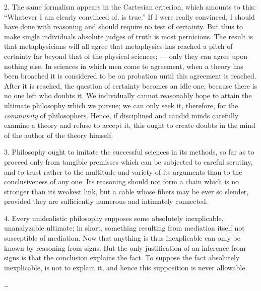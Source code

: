 2. The same formalism appears in the Cartesian criterion, which amounts to this: ``Whatever I am clearly convinced of, is true.'' If I were really convinced, I should have done with reasoning and should require no test of certainty. But thus to make single individuals absolute judges of truth is most pernicious. The result is that metaphysicians will all agree that metaphysics has reached a pitch of certainty far beyond that of the physical sciences; --- only they can agree upon nothing else. In sciences in which men come to agreement, when a theory has been broached it is considered to be on probation until this agreement is reached. After it is reached, the question of certainty becomes an idle one, because there is no one left who doubts it. We individually cannot reasonably hope to attain the ultimate philosophy which we pursue; we can only seek it, therefore, for the \emph{community} of philosophers. Hence, if disciplined and candid minds carefully examine a theory and refuse to accept it, this ought to create doubts in the mind of the author of the theory himself.

3. Philosophy ought to imitate the successful sciences in its methods, so far as to proceed only from tangible premisses which can be subjected to careful scrutiny, and to trust rather to the multitude and variety of its arguments than to the conclusiveness of any one. Its reasoning should not form a chain which is no stronger than its weakest link, but a cable whose fibers may be ever so slender, provided they are sufficiently numerous and intimately connected.

4. Every unidealistic philosophy supposes some absolutely inexplicable, unanalyzable ultimate; in short, something resulting from mediation itself not susceptible of mediation. Now that anything is thus inexplicable can only be known by reasoning from signs. But the only justification of an inference from signs is that the conclusion explains the fact. To suppose the fact absolutely inexplicable, is not to explain it, and hence this supposition is never allowable.

\ldots




 